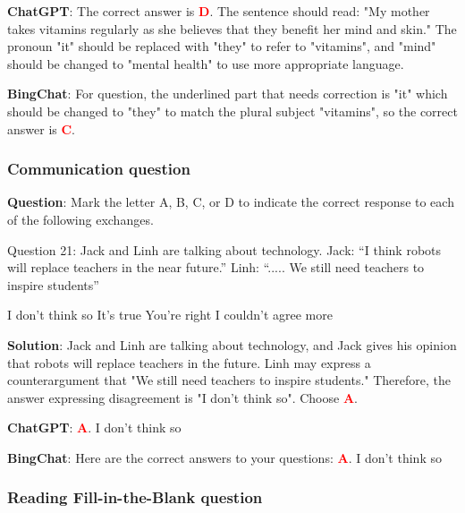 \documentclass{article}
\begin{document}
{\begin{mdframed}[linewidth=1pt,linecolor=red]
		\textbf{ChatGPT}: The correct answer is \textcolor{red}{\textbf{D}}. The sentence should read: "My mother takes vitamins regularly as she believes that they benefit her mind and skin." The pronoun "it" should be replaced with "they" to refer to "vitamins", and "mind" should be changed to "mental health" to use more appropriate language.
		
		\textbf{BingChat}: For question, the underlined part that needs correction is "it" which should be changed to "they" to match the plural subject "vitamins", so the correct answer is \textcolor{red}{\textbf{C}}.
		
	\end{mdframed}
	
	\subsubsection{Communication question}
	\label{VNHSGE_Eng_C}
	
	
	\begin{mdframed}[linewidth=1pt,linecolor=red] \textbf{Question}: Mark the letter A, B, C, or D to indicate the correct response to each of the following exchanges.
		
		Question 21: Jack and Linh are talking about technology.
		Jack: “I think robots will replace teachers in the near future.” 
		Linh: “..... We still need teachers to inspire students”
		
		\begin{oneparchoices}
			\choice I don’t think so	
			\choice It’s true	
			\choice You’re right	
			\choice I couldn’t agree more
		\end{oneparchoices}
		
		\textbf{Solution}: Jack and Linh are talking about technology, and Jack gives his opinion that robots will replace teachers in the future. Linh may express a counterargument that "We still need teachers to inspire students." Therefore, the answer expressing disagreement is 
		"I don’t think so". Choose \textcolor{red}{\textbf{A}}. 
		
		\textbf{ChatGPT}: \textcolor{red}{\textbf{A}}. I don’t think so
		
		\textbf{BingChat}: Here are the correct answers to your questions: \textcolor{red}{\textbf{A}}. I don’t think so
		
		
	\end{mdframed}
	
	\subsubsection{Reading Fill-in-the-Blank question}
	\label{VNHSGE_Eng_RB}
	
}
\end{document}
